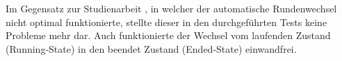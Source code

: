Im Gegensatz zur Studienarbeit \cite{methode635-sa}, in welcher der automatische Rundenwechsel nicht optimal funktionierte, stellte dieser in den durchgeführten Tests keine Probleme mehr dar. Auch funktionierte der Wechsel vom laufenden Zustand (Running-State) in den beendet Zustand (Ended-State) einwandfrei. 